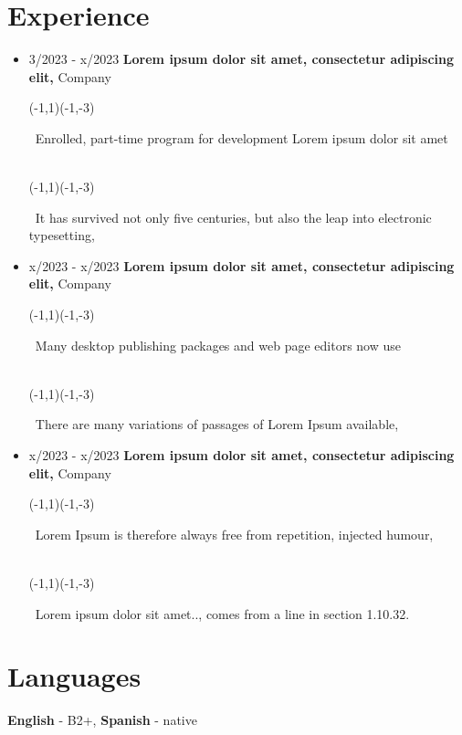 \documentclass[letterpaper,9pt]{article}
\newcommand{\smalltextbullet}{\,\begin{picture}(-1,1)(-1,-3)\circle*{3}\end{picture}\ }
\begin{document}
    \section{Experience}
    \begin{itemize}
        \item[]
        {3/2023 - x/2023}
        \hspace*{6pt}
        {\textbf{Lorem ipsum dolor sit amet, consectetur adipiscing elit,}} \hfill 	Company
      \newline
      \hspace*{80pt}
        \smalltextbullet Enrolled, part-time program for development Lorem ipsum dolor sit amet \\
        \hspace*{80pt}
        \smalltextbullet It has survived not only five centuries, but also the leap into electronic typesetting,
        \item[]
        {x/2023 - x/2023}
        \hspace*{6pt}
        {\textbf{Lorem ipsum dolor sit amet, consectetur adipiscing elit,}}  \hfill Company
        \newline
        \hspace*{80pt}
        \smalltextbullet Many desktop publishing packages and web page editors now use  \\
        \hspace*{80pt}
        \smalltextbullet There are many variations of passages of Lorem Ipsum available,
      \item[]
        {x/2023 - x/2023}
        \hspace*{6pt}
        {\textbf{Lorem ipsum dolor sit amet, consectetur adipiscing elit,}}  \hfill		Company
        \newline
        \hspace*{80pt}
        \smalltextbullet Lorem Ipsum is therefore always free from repetition, injected humour,\\
        \hspace*{80pt}
        \smalltextbullet  Lorem ipsum dolor sit amet.., comes from a line in section 1.10.32.
    \end{itemize}
    
    \vspace{-10 pt}
	\section{Languages}
    \hspace{26mm} \textbf{English} - B2+, \textbf{ Spanish} - native
    
\end{document}
